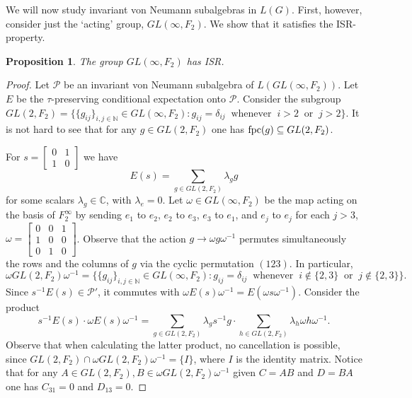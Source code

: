 \documentclass[11pt]{amsart}
\newcommand{\fpc}{{\rm fpc}}
\newcommand{\ie}{\text{i.e.\;}}
\theoremstyle{plain}
\newtheorem{proposition}[theorem]{Proposition}
\theoremstyle{definition}
\theoremstyle{remark}
\numberwithin{equation}{section}
\begin{document}
We will now study invariant von Neumann subalgebras in $L(G)$. First, however, consider just the `acting' group, $GL(\infty,F_2)$. We show that it satisfies the ISR-property.
\begin{proposition}\label{prop:(GLinfty,F2)_has_ISR}
	The group $GL(\infty,F_2)$ has ISR.
\end{proposition}
\begin{proof}
Let $\mathcal P$ be an invariant von Neumann subalgebra of $L(GL(\infty,F_2))$. Let $E$ be the $\tau$-preserving conditional expectation onto $\mathcal{P}$. Consider the subgroup $GL(2,F_2)=\{\{g_{ij}\}_{i,j\in\mathbb N}\in GL(\infty,F_2):g_{ij}=\delta_{ij}\;\;\text{whenever}\;\;i>2\;\;\text{or}\;\;j>2\}$. It is not hard to see that for any $g\in GL(2,F_2)$ one has $\fpc(g)\subseteq GL(2,F_2)$. 

For $s=\begin{bmatrix}
	0&1\\1&0
\end{bmatrix}$
we have 
$$E\left(s\right)=\sum\limits_{g\in GL(2,F_2)}\lambda_g g$$
for some scalars $\lambda_g \in \mathbb{C}$, with $\lambda_e=0$. Let $\omega\in GL(\infty,F_2)$ be the map acting on the basis of $F_2^\infty$ by sending $e_1$ to $e_2$, $e_2$ to $e_3$, $e_3$ to $e_1$, and $e_j$ to $e_j$ for each $j>3$, \ie $\omega=\begin{bmatrix}
	0&0&1\\
	1&0&0\\
	0&1&0
\end{bmatrix}$. Observe that the action $g\to \omega g\omega^{-1}$ permutes simultaneously the rows and the columns of $g$ via the cyclic permutation $(123)$. In particular, 
$$\omega GL(2,F_2)\omega^{-1}=\{\{g_{ij}\}_{i,j\in\mathbb N}\in GL(\infty,F_2):g_{ij}=\delta_{ij}\;\;\text{whenever}\;\;i\notin\{2,3\}\;\;\text{or}\;\;j\notin\{2,3\}\}.$$ 
Since $s^{-1}E(s)\in\mathcal P'$, it commutes with $\omega E(s)\omega^{-1}=E(\omega s\omega^{-1}).$ Consider the product $$s^{-1}E(s)\cdot \omega E(s)\omega^{-1}=\sum\limits_{g\in GL(2,F_2)}\lambda_g s^{-1}g\cdot \sum\limits_{h\in GL(2,F_2)}\lambda_h \omega h\omega^{-1}.$$ Observe that when calculating the latter product, no cancellation is possible, since $GL(2,F_2)\cap \omega GL(2,F_2)\omega^{-1}=\{I\}$, where $I$ is the identity matrix. Notice that for any $A\in GL(2,F_2),B\in \omega GL(2,F_2)\omega^{-1}$ given $C=AB$ and $D=BA$ one has $C_{31}=0$ and $D_{13}=0$. 
		

\end{proof}
\end{document}
